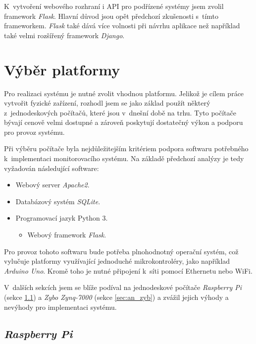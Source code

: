 K~vytvoření webového rozhraní i API pro podřízené systémy jsem zvolil framework \textit{Flask}. Hlavní důvod jsou opět předchozí zkušenosti s~tímto frameworkem. \textit{Flask} také dává více volnosti při návrhu aplikace než například také velmi rozšířený framework \textit{Django}.

\section{Výběr platformy}
\label{sec:an_plat}

Pro realizaci systému je nutné zvolit vhodnou platformu. Jelikož je cílem práce vytvořit fyzické zařízení, rozhodl jsem se jako základ použít některý z~jednodeskových počítačů, které jsou v~dnešní době na trhu. Tyto počítače bývají cenově velmi dostupné a zároveň poskytují dostatečný výkon a podporu pro provoz systému.

Při výběru počítače byla nejdůležitejším kritériem podpora softwaru potřebného k~implementaci monitorovacího systému. Na základě předchozí analýzy je tedy vyžadován následující software:

\begin{itemize}
    \item Webový server \textit{Apache2}.
    \item Databázový systém \textit{SQLite}.
    \item Programovací jazyk Python 3.
    \begin{itemize}
        \item Webový framework \textit{Flask}.
    \end{itemize}
\end{itemize}

Pro provoz tohoto softwaru bude potřeba plnohodnotný operační systém, což vylučuje platformy využívající jednoduché mikrokontroléry, jako například \textit{Arduino Uno}. Kromě toho je nutné připojení k~síti pomocí Ethernetu nebo WiFi. 

V~dalších sekcích jsem se blíže podíval na jednodeskové počítače \textit{Raspberry Pi} (sekce \ref{sec:an_rpi}) a \textit{Zybo Zynq-7000} (sekce \ref{sec:an_zyb}) a zvážil jejich výhody a nevýhody pro implementaci systému.

\subsection{\textit{Raspberry Pi}}
\label{sec:an_rpi}


